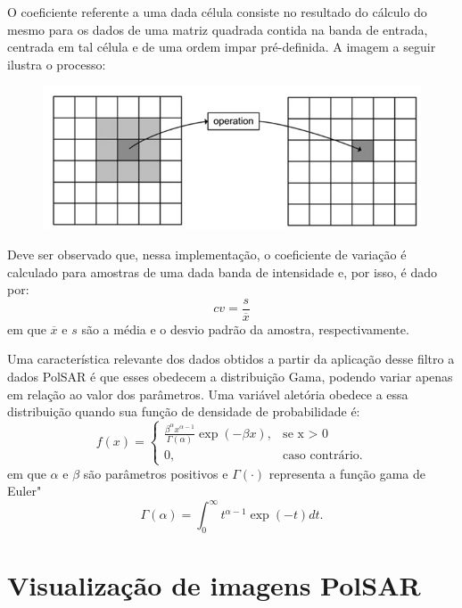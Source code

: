 \documentclass[12pt]{article}
\begin{document}
O coeficiente referente a uma dada célula consiste no resultado do cálculo do mesmo para os dados de uma matriz quadrada contida na banda de entrada, centrada em tal célula e de uma ordem impar pré-definida. A imagem a seguir ilustra o processo:

\begin{figure}[h!]
\centering \includegraphics[scale = 0.5]{../../Images/Report_29_08_18/filter.png}
\end{figure}

Deve ser observado que, nessa implementação, o coeficiente de variação é calculado para amostras de uma dada banda de intensidade e, por isso, é dado por:
\begin{displaymath}
cv = \frac{ s }{ \overline{x} }
\end{displaymath}
em que $\overline{x}$ e $s$ são a média e o desvio padrão da amostra, respectivamente.

Uma característica relevante dos dados obtidos a partir da aplicação desse filtro a dados PolSAR é que esses obedecem a distribuição Gama, podendo variar apenas em relação ao valor dos parâmetros. Uma variável aletória obedece a essa distribuição quando sua função de densidade de probabilidade é:
\begin{displaymath}
f(x) =
\begin{cases}
\frac{ \beta^{\alpha} x^{\alpha - 1} }{ \Gamma(\alpha)} \exp(-\beta x), & \mbox{se x }>\mbox{ 0}\\
0, & \mbox{caso contrário.}
\end{cases}
\end{displaymath}
em que $\alpha$ e $\beta$ são parâmetros positivos e $\Gamma(\cdot)$ representa a função gama de Euler"
\begin{displaymath}
\Gamma(\alpha) = \int_{0}^{\infty} t^{\alpha - 1} \exp(-t) dt.
\end{displaymath}

\section{Visualização de imagens PolSAR}
\end{document}

